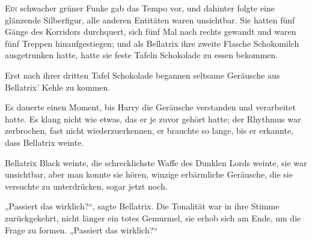 
\lettrine{E}{in} schwacher grüner Funke gab das Tempo vor, und dahinter folgte eine glänzende Silberfigur, alle anderen Entitäten waren unsichtbar. Sie hatten fünf Gänge des Korridors durchquert, sich fünf Mal nach rechts gewandt und waren fünf Treppen hinaufgestiegen; und als Bellatrix ihre zweite Flasche Schokomilch ausgetrunken hatte, hatte sie feste Tafeln Schokolade zu essen bekommen.

Erst nach ihrer dritten Tafel Schokolade begannen seltsame Geräusche aus Bellatrix’ Kehle zu kommen.

Es dauerte einen Moment, bis Harry die Geräusche verstanden und verarbeitet hatte. Es klang nicht wie etwas, das er je zuvor gehört hatte; der Rhythmus war zerbrochen, fast nicht wiederzuerkennen, er brauchte so lange, bis er erkannte, dass Bellatrix weinte.

Bellatrix Black weinte, die schrecklichste Waffe des Dunklen Lords weinte, sie war unsichtbar, aber man konnte sie hören, winzige erbärmliche Geräusche, die sie versuchte zu unterdrücken, sogar jetzt noch.

„Passiert das wirklich?“, sagte Bellatrix. Die Tonalität war in ihre Stimme zurückgekehrt, nicht länger ein totes Gemurmel, sie erhob sich am Ende, um die Frage zu formen. „Passiert das wirklich?“


